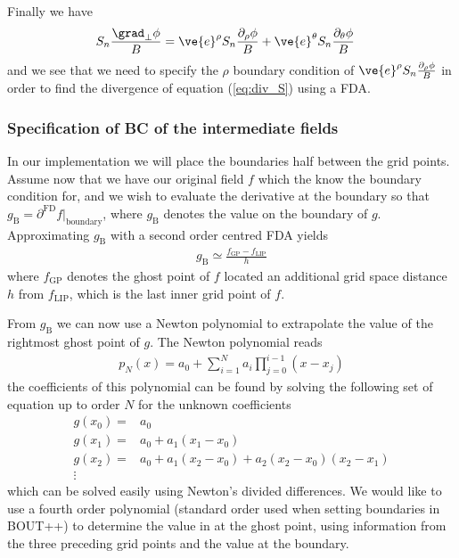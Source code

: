 Finally we have
%
\begin{align}
 S_n \frac{ \grad_\perp \phi }{B}
 &=
 \ve{e}^\rho S_n \frac{ \partial_\rho \phi }{B}
 +\ve{e}^\theta S_n \frac{ \partial_\theta \phi }{B}
 \label{eq:div_S}
\end{align}
%
and we see that we need to specify the $\rho$ boundary condition of
$ \ve{e}^\rho S_n \frac{ \partial_\rho \phi }{B}$ in order to find the
divergence of equation (\ref{eq:div_S}) using a FDA.

\subsubsection{Specification of BC of the intermediate fields}
%
In our implementation we will place the boundaries half between the grid
points. Assume now that we have our original field $f$ which the know the
boundary condition for, and we wish to evaluate the derivative at the boundary
so that $g_{\text{B}}=\partial^{\text{FD}}f\bigg|_\text{boundary}$, where
$g_{\text{B}}$ denotes the value on the boundary of $g$. Approximating
$g_{\text{B}}$ with a second order centred FDA yields
%
\begin{align*}
    g_{\text{B}} \simeq \frac{f_\text{GP} - f_{\text{LIP}}}{h}
\end{align*}
%
where $f_\text{GP}$ denotes the ghost point of $f$ located an additional grid
space distance $h$ from $f_{\text{LIP}}$, which is the last inner grid point of
$f$.

From $g_{\text{B}}$ we can now use a Newton polynomial to extrapolate the
value of the rightmost ghost point of $g$. The Newton polynomial reads
%
\begin{align}
    p_N(x)=a_0+\sum_{i=1}^Na_i\prod_{j=0}^{i-1}(x-x_j)
    \label{eq:new_pol}
\end{align}
%
the coefficients of this polynomial can be found by solving the following set
of equation up to order $N$ for the unknown coefficients
%
\begin{equation}
    \begin{aligned}
        g(x_0)=&a_0\\
        g(x_1)=&a_0+a_1(x_1-x_0)\\
        g(x_2)=&a_0+a_1(x_2-x_0) + a_2(x_2-x_0)(x_2-x_1)\\
        \vdots&
        \label{eq:divdiffsys}
    \end{aligned}
\end{equation}
%
which can be solved easily using Newton's divided differences.
We would like to use a fourth order polynomial (standard order used when
setting boundaries in BOUT++) to determine the value in at the ghost point,
using information from the three preceding grid points and the value at the
boundary.

